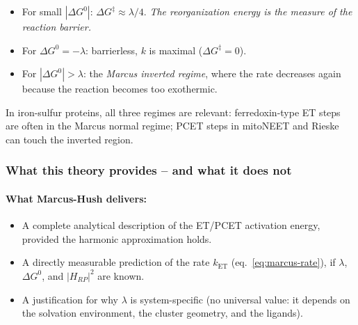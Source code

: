 \documentclass[11pt,a4paper,twoside]{article}
\theoremstyle{remark}
\begin{document}
\begin{itemize}\setlength{\itemsep}{0pt}
  \item For small $|\Delta G^0|$: $\Delta G^\ddagger \approx
        \lambda/4$. \emph{The reorganization energy is the measure
        of the reaction barrier.}
  \item For $\Delta G^0 = -\lambda$: barrierless, $k$ is maximal
        ($\Delta G^\ddagger = 0$).
  \item For $|\Delta G^0| > \lambda$: the \emph{Marcus inverted
        regime}, where the rate decreases again because the
        reaction becomes too exothermic.
\end{itemize}

In iron-sulfur proteins, all three regimes are relevant:
ferredoxin-type ET steps are often in the Marcus normal regime;
PCET steps in mitoNEET and Rieske can touch the inverted region.

\subsubsection*{What this theory provides -- and what it does not}

\paragraph{What Marcus-Hush delivers:}
\begin{itemize}\setlength{\itemsep}{0pt}
  \item A complete analytical description of the ET/PCET
        activation energy, provided the harmonic approximation
        holds.
  \item A directly measurable prediction of the rate
        $k_\text{ET}$ (eq.~\ref{eq:marcus-rate}), if $\lambda$,
        $\Delta G^0$, and $|H_{RP}|^2$ are known.
  \item A justification for why $\lambda$ is system-specific (no
        universal value: it depends on the solvation environment,
        the cluster geometry, and the ligands).
\end{itemize}
\end{document}
